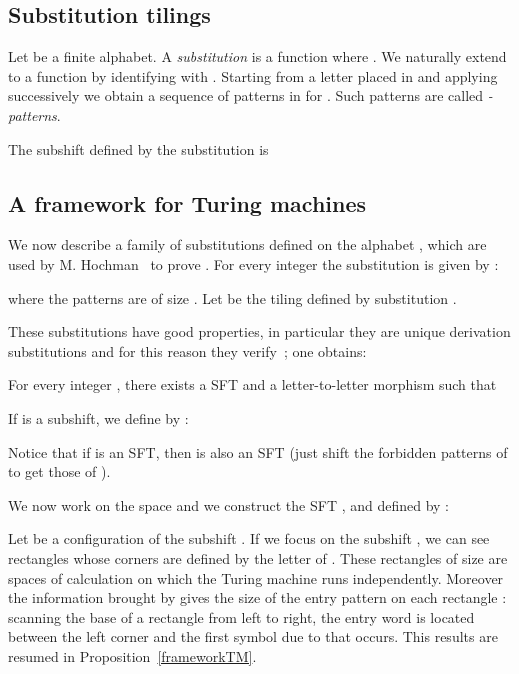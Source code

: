 \documentclass[proceedings]{stacs}
\theoremstyle{plain}\newtheorem{satz}[thm]{Satz}
\theoremstyle{definition}\newtheorem{crucial}[thm]{Crucial Definition}
\begin{document}
	\subsection{Substitution tilings}

Let  be a finite alphabet. A \emph{substitution} is a function  where  . We naturally extend  to a function  by identifying  with .
Starting from a letter placed in  and applying successively  we obtain a sequence of patterns in  for . Such patterns are called \emph{-patterns}.

\begin{definition}
The subshift  defined by the substitution  is

\end{definition}


	\subsection{A framework for Turing machines}

We now describe a family of substitutions  defined on the alphabet , which are used by M. Hochman~\cite{hochman2007drp} to prove . For every integer  the substitution  is given by :
\begin{tiny}

\end{tiny}
where the patterns are of size . Let  be the tiling defined by substitution .

These substitutions have good properties, in particular they are unique derivation substitutions and for this reason they verify~\cite{mozes1989tss}; one obtains:
\begin{proposition}
For every integer , there exists a SFT   and a letter-to-letter morphism  such that 
\end{proposition}

\begin{definition}
If  is a subshift, we define  by :


Notice that if  is an SFT, then  is also an SFT (just shift the forbidden patterns of  to get those of ).
\end{definition}

We now work on the space  and we construct the SFT ,  and  defined by :



Let  be a configuration of the subshift . If we focus on the subshift , we can see rectangles whose corners are defined by the letter  of . These rectangles of size  are spaces of calculation on which the Turing machine runs independently. Moreover the information brought by  gives the size of the entry pattern  on each rectangle : scanning the base of a rectangle from left to right, the entry word is located between the left corner and the first symbol  due to  that occurs. This results are resumed in Proposition~\ref{frameworkTM}.
\end{document}
